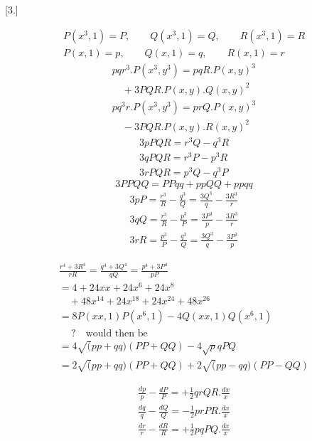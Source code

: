 \begingroup
\renewcommand{\arraystretch}{1.45}

\par\medskip{}\centerline{[3.]}\nobreak\smallskip
\[
\begin{gathered}
P(x^3,1)=P,\qquad Q(x^3,1)=Q,\qquad R(x^3,1)=R\\[8pt]
P(x,1)=p,\qquad Q(x,1)=q,\qquad R(x,1)=r
\end{gathered}
\]
\[
\begin{gathered}
pqr^3.P(x^3,y^3)=pqR.P(x,y)^3\\[8pt]\quad{}+3PQR.P(x,y).Q(x,y)^2\\[8pt]
pq^3r.P(x^3,y^3)=prQ.P(x,y)^3\\[8pt]\quad{}-3PQR.P(x,y).R(x,y)^2
\end{gathered}
\]
\[
\begin{gathered}
3pPQR=r^3Q-q^3R\\[8pt]
3qPQR=r^3P-p^3R\\[8pt]
3rPQR=p^3Q-q^3P
\end{gathered}
\]
\[
3PPQQ=PPqq+ppQQ+ppqq
\]
\[
\begin{gathered}
3pP=\frac{r^3}{R}-\frac{q^3}{Q}=\frac{3Q^3}{q}-\frac{3R^3}{r}\\[8pt]
3qQ=\frac{r^3}{R}-\frac{p^3}{P}=\frac{3P^3}{p}-\frac{3R^3}{r}\\[8pt]
3rR=\frac{p^3}{P}-\frac{q^3}{Q}=\frac{3Q^3}{q}-\frac{3P^3}{p}
\end{gathered}
\]

\[
\begin{gathered}
\frac{r^4+3R^4}{rR}=\frac{q^4+3Q^4}{qQ}=\frac{p^4+3P^4}{pP}\\[8pt]
=4+24xx+24x^6+24x^8\\[8pt]\quad{}+48x^{14}+24x^{18}+24x^{24}+48x^{26}\\[8pt]
=8P(xx,1)P(x^6,1)-4Q(xx,1)Q(x^6,1)\\[8pt]\quad{}\ ?\quad\text{would then be}\\[8pt]
=4\surd(pp+qq)(PP+QQ)-4\surd pqPQ\\[8pt]
=2\surd(pp+qq)(PP+QQ)+2\surd(pp-qq)(PP-QQ)
\end{gathered}
\]





\[
\begin{gathered}
\frac{dp}{p}-\frac{dP}{P}=+\tfrac12qrQR.\frac{dx}{x}\\[8pt]
\frac{dq}{q}-\frac{dQ}{Q}=-\tfrac12prPR.\frac{dx}{x}\\[8pt]
\frac{dr}{r}-\frac{dR}{R}=+\tfrac12pqPQ.\frac{dx}{x}
\end{gathered}
\]


